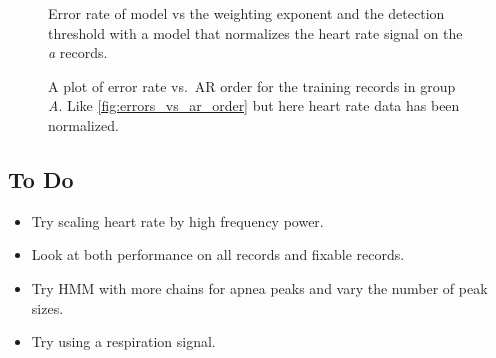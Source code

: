 \documentclass[12pt]{article}
\newcommand{\BestModel}{\emph{two\_ar5\_masked}}
\begin{document}
\begin{table*}
  \centering
  
  \caption[Performance]{Performance of pass-1 combined with pass-2 on
    training data with model
    \BestModel for pass-2.}
  \label{tab:score_initial}
\end{table*}

\begin{figure}
  \centering
    \caption{Error rate of model vs the weighting exponent and the
      detection threshold with a model that normalizes the heart rate
      signal on the \emph{a} records.}
  \label{fig:norm_power_threshold}
\end{figure}

\begin{figure}
  \centering
    \caption{A plot of error rate vs.\ AR order for the training
      records in group \emph{A}.  Like \ref{fig:errors_vs_ar_order}
      but here heart rate data has been normalized.}
  \label{fig:norm_errors_vs_ar_order}
\end{figure}

\begin{table*}
  \centering
  
  \caption[Performance]{Performance of pass-1 combined with pass-2 on
    training data with model norm\_ar5\_masked which normalizes the
    heart rate signal for pass-2.}
  \label{tab:norm_score}
\end{table*}

\subsection{To Do}

\begin{itemize}
\item Try scaling heart rate by high frequency power.
\item Look at both performance on all records and fixable records.
\item Try HMM with more chains for apnea peaks and vary the number of
  peak sizes.
\item Try using a respiration signal.
\end{itemize}

\begin{table*}
  \centering
  
  \caption[Performance]{Performance of model \BestModel on the
    \emph{a} records sorted by fraction of classification errors.
    Records a09 and a18 could be marked all apnea based on their high
    likelihood.  However it would be bad to treat x09 and x23 which
    are near a09 in Fig.~\ref{fig:statistics} the same way.}
  \label{tab:pass2performance}
\end{table*}
\end{document}
